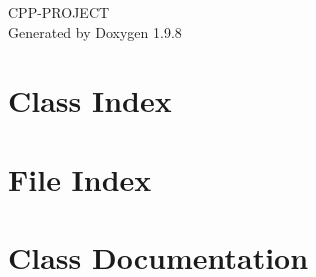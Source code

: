 \documentclass[twoside]{book}
\newcommand{\+}{\discretionary{\mbox{\scriptsize$\hookleftarrow$}}{}{}}
\newcommand{\clearemptydoublepage}{%
    \newpage{\pagestyle{empty}\cleardoublepage}%
  }
\begin{document}
  \raggedbottom
    \hypersetup{pageanchor=false,
                bookmarksnumbered=true,
                pdfencoding=unicode
               }
  \begin{titlepage}
  \vspace*{7cm}
  \begin{center}%
  {\Large CPP-\/\+PROJECT}\\
  \vspace*{1cm}
  {\large Generated by Doxygen 1.9.8}\\
  \end{center}
  \end{titlepage}
  \clearemptydoublepage
  \tableofcontents
  \clearemptydoublepage
  \hypersetup{pageanchor=true}

\chapter{Class Index}

\chapter{File Index}

\chapter{Class Documentation}


\end{document}
